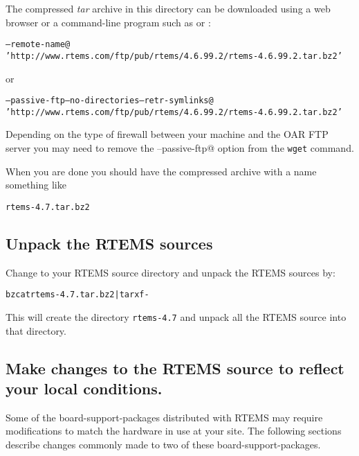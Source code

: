 \documentclass{report}
\newcommand{\rtemsVersion}{4.7}
\begin{document}
The compressed {\it tar} archive in this directory can be downloaded using a web browser or a command-line program such as \verb@curl@ or \verb@wget@:
{\small
\begin{alltt}
\verb@curl --remote-name@
\hspace{0.2in}'http://www.rtems.com/ftp/pub/rtems/4.6.99.2/rtems-4.6.99.2.tar.bz2'
\end{alltt}
or
\begin{alltt}
\verb@wget --passive-ftp --no-directories --retr-symlinks@
\hspace{0.2in}'http://www.rtems.com/ftp/pub/rtems/4.6.99.2/rtems-4.6.99.2.tar.bz2'
\end{alltt}
}
Depending on the type of firewall between your machine and the OAR FTP server
you may need to remove the \verb@--passive-ftp@ option from the {\tt wget} command.


When you are done you should have the compressed archive with a name something like
\begin{alltt}
rtems-\rtemsVersion.tar.bz2
\end{alltt}

\subsection {Unpack the RTEMS sources}
Change to your RTEMS source directory and unpack the RTEMS sources by:
\begin{alltt}
bzcat rtems-\rtemsVersion.tar.bz2 | tar xf -
\end{alltt}
This will create the directory {\tt rtems-\rtemsVersion} 
and unpack all the RTEMS source into that directory.

\subsection {Make changes to the RTEMS source to reflect your local conditions.}
Some of the board-support-packages distributed with RTEMS may require
modifications to match the hardware in use at your site.  The following 
sections describe changes commonly made to two of these board-support-packages.
\end{document}
